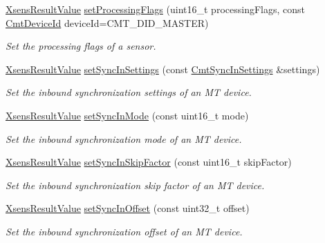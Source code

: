 \begin{DoxyCompactItemize}
\hyperlink{group__enums_ga822a2260a20af524029eef9e9a51ff6f}{\-Xsens\-Result\-Value} \hyperlink{classxsens_1_1Cmt3_a3718a4e2bc811db2768245c9715f06cc}{set\-Processing\-Flags} (uint16\-\_\-t processing\-Flags, const \hyperlink{cmtdef_8h_a2e3b6a17360828d440ee848959918af2}{\-Cmt\-Device\-Id} device\-Id=\-C\-M\-T\-\_\-\-D\-I\-D\-\_\-\-M\-A\-S\-T\-E\-R)
\begin{DoxyCompactList}\small\item\em \-Set the processing flags of a sensor. \end{DoxyCompactList}\item 
\hyperlink{group__enums_ga822a2260a20af524029eef9e9a51ff6f}{\-Xsens\-Result\-Value} \hyperlink{classxsens_1_1Cmt3_abd43906b1fa1c3eec21b888d6334b8d0}{set\-Sync\-In\-Settings} (const \hyperlink{structCmtSyncInSettings}{\-Cmt\-Sync\-In\-Settings} \&settings)
\begin{DoxyCompactList}\small\item\em \-Set the inbound synchronization settings of an \-M\-T device. \end{DoxyCompactList}\item 
\hyperlink{group__enums_ga822a2260a20af524029eef9e9a51ff6f}{\-Xsens\-Result\-Value} \hyperlink{classxsens_1_1Cmt3_adb6b61e8b69146b813395c74de9e3b19}{set\-Sync\-In\-Mode} (const uint16\-\_\-t mode)
\begin{DoxyCompactList}\small\item\em \-Set the inbound synchronization mode of an \-M\-T device. \end{DoxyCompactList}\item 
\hyperlink{group__enums_ga822a2260a20af524029eef9e9a51ff6f}{\-Xsens\-Result\-Value} \hyperlink{classxsens_1_1Cmt3_a943a9f7d0c7af42d11773ad6a3715954}{set\-Sync\-In\-Skip\-Factor} (const uint16\-\_\-t skip\-Factor)
\begin{DoxyCompactList}\small\item\em \-Set the inbound synchronization skip factor of an \-M\-T device. \end{DoxyCompactList}\item 
\hyperlink{group__enums_ga822a2260a20af524029eef9e9a51ff6f}{\-Xsens\-Result\-Value} \hyperlink{classxsens_1_1Cmt3_a1799498eb4b572a4db9a418ab915b404}{set\-Sync\-In\-Offset} (const uint32\-\_\-t offset)
\begin{DoxyCompactList}\small\item\em \-Set the inbound synchronization offset of an \-M\-T device. \end{DoxyCompactList}\item 

\end{DoxyCompactItemize}
